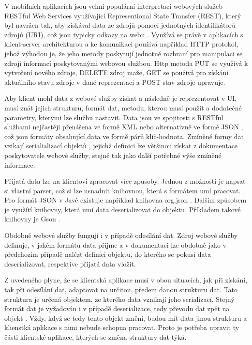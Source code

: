 V mobilních aplikacích jsou velmi populární interpretací webových služeb RESTful Web Services využívající Representional State Transfer (REST), který byl navržen tak, aby získával data ze zdrojů pomocí jednotných identifikátorů zdrojů (URI), což jsou typicky odkazy na webu \cite{oracle-ws}. Využívá se právě v aplikacích s klient-server architekturou a ke komunikaci používá například HTTP protokol, jehož výhodou je, že jeho metody poskytují jednotné rozhraní pro manipulaci se zdroji informací poskytovanými webovou službou. Http metoda PUT se využívá k vytvoření nového zdroje, DELETE zdroj maže, GET se používá pro získání aktuálního stavu zdroje v dané reprezentaci a POST stav zdroje upravuje. 

Aby klient mohl data z webové služby získat a následně je reprezentovat v UI, musí znát jejich strukturu, formát dat, metodu, kterou musí použít a dodatečné parametry, kterými lze službu nastavit. Data jsou ve spojitosti s RESTful službami nejčastěji přenášena ve formě XML nebo alternativně ve formě JSON \cite{ws-formats}, což jsou formáty obsahující data ve formě párů klíč-hodnota. Zmíněné formy dat vzikají serialializací objektů \cite{serialization}, jejichž definici lze většinou získat z dokumentace poskytovatele webové služby, stejně tak jako další potřebné výše zmíněné informace.

Přijatá data lze na klientovi zpracovat více způsoby. Jednou z možností je napsat si vlastní parser, což si lze usnadnit knihovnou, která s formátem umí pracovat. Pro formát JSON v Javě existuje například knihovna org.json \cite{json}. Dalším způsobem je využítí knihovny, která umí data deserializovat do objektu. Příkladem takové knihovny je Gson \cite{gson}. 

Obdobně webové služby fungují i v případě odesílání dat. Zdroj webové služby definuje, v jakém formátu data přijme a v dokumentaci lze obdobně jako v předchozím případě nalézt definici objektu, do kterého se pokusí data deserializovat, respektive přijatá data vložit. 

Z uvedeného plyne, že se klientská aplikace musí v obou situacích, jak při získání, tak při odesílání dat, adaptovat na určitou, předem danou strukturu dat. Tato struktura je určená objektem, ze kterého data vznikají jeho serializací. Stejný formát dat je vyžadován i v případě deserializace, tedy převodu dat zpět na objekt \cite{serialization}. Vždy, když se tedy tento objekt změní, budou mít data jinou strukturu a klienstká aplikace s nimi nebude schopna pracovat. Proto je potřeba upravit ty části klientské aplikace, kterých se změna struktury dat týká.

